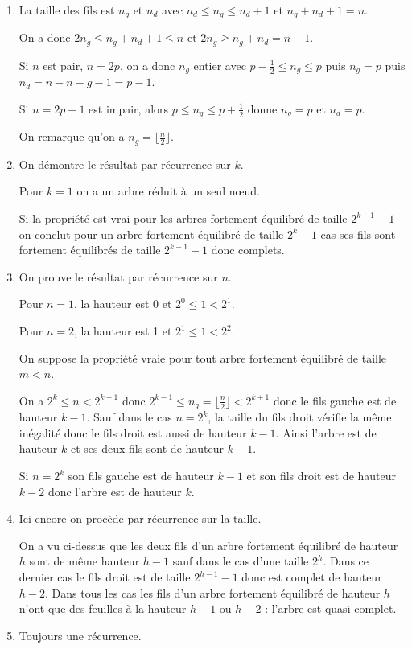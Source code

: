 \begin{Answer} 
\begin{enumerate}
\item La taille des fils est $n_g$ et $n_d$ avec $n_d\le n_g \le n_d+1$ et $n_g+n_d+1=n$.

On a donc $2n_g\le n_g+n_d+1 \le n$ et $2n_g\ge n_g+n_d = n-1$.

Si $n$ est pair, $n=2p$, on a donc $n_g$ entier avec $p-\frac 12 \le n_g \le p$ puis $n_g =p$ puis $n_d=n-n-g-1=p-1$.

Si $n=2p+1$ est impair, alors $p \le n_g \le p+\frac 12$ donne $n_g=p$ et $n_d=p$.

On remarque qu'on a $n_g=\bigl\lfloor \frac n2\bigr\rfloor$.
\item On démontre le résultat par récurrence sur $k$.

Pour $k=1$ on a un arbre réduit à un seul nœud.

Si la propriété est vrai pour les arbres fortement équilibré de taille $2^{k-1}-1$ on conclut pour un arbre fortement équilibré de taille $2^k-1$ cas ses fils sont fortement équilibrés de taille $2^{k-1}-1$ donc complets.
\item On prouve le résultat par récurrence sur $n$.

Pour $n=1$, la hauteur est 0 et $2^0\le 1 < 2^1$.

Pour $n = 2$, la hauteur est 1 et $2^1\le 1 < 2^2$.

On suppose la propriété vraie pour tout arbre fortement équilibré de taille $m< n$.

On a $2^k \le n < 2^{k+1}$ donc $2^{k-1} \le n_g=\bigl\lfloor \frac n2\bigr\rfloor < 2^{k+1}$ donc le fils gauche est de hauteur $k-1$. Sauf dans le cas $n=2^k$, la taille du fils droit vérifie la même inégalité donc le fils droit est aussi de hauteur $k-1$. Ainsi l'arbre est de hauteur $k$ et ses deux fils sont de hauteur $k-1$.

Si $n=2^k$ son fils gauche est de hauteur $k-1$ et son fils droit est de hauteur $k-2$ donc l'arbre est de hauteur $k$.
\item Ici encore on procède par récurrence sur la taille.

On a vu ci-dessus que les deux fils d'un arbre fortement équilibré de hauteur $h$ sont de même hauteur $h-1$ sauf dans le cas d'une taille $2^h$. Dans ce dernier cas le fils droit est de taille $2^{h-1}-1$ donc est complet de hauteur $h-2$. Dans tous les cas les fils d'un arbre fortement équilibré de hauteur $h$ n'ont que des feuilles à la hauteur $h-1$ ou $h-2$ : l'arbre est quasi-complet.
\item Toujours une récurrence.
\end{enumerate}
\end{Answer}



